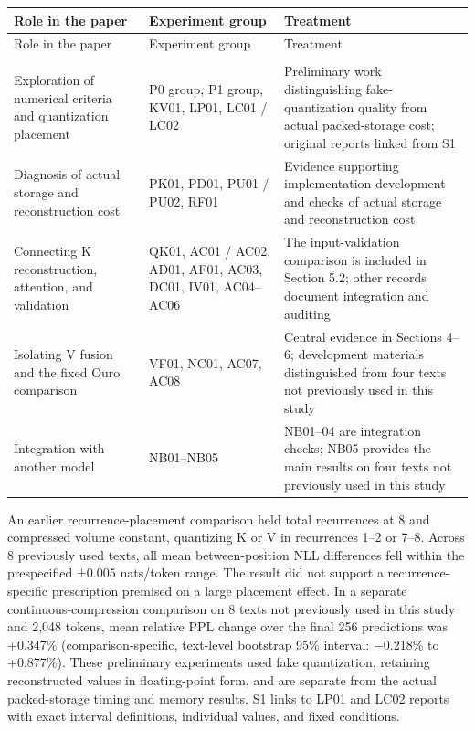 \documentclass[10pt,a4paper]{article}
\newlength{\usable}
\begin{document}
\begingroup\fontsize{9.1}{12}\selectfont\setlength{\parskip}{1pt}
\setlength{\usable}{\dimexpr\linewidth-4\tabcolsep\relax}
\begin{longtable}{@{}>{\raggedright\arraybackslash}p{0.26\usable}>{\raggedright\arraybackslash}p{0.3\usable}>{\raggedright\arraybackslash}p{0.44\usable}@{}}
\toprule
Role in the paper & Experiment group & Treatment \\
\midrule\endfirsthead
\toprule
Role in the paper & Experiment group & Treatment \\
\midrule\endhead
\midrule
\multicolumn{3}{r}{\scriptsize Continued on the next page}\\\endfoot
\bottomrule\endlastfoot
Exploration of numerical criteria and quantization placement & P0 group, P1 group, KV01, LP01, LC01 / LC02 & Preliminary work distinguishing fake-quantization quality from actual packed-storage cost; original reports linked from S1 \\
Diagnosis of actual storage and reconstruction cost & PK01, PD01, PU01 / PU02, RF01 & Evidence supporting implementation development and checks of actual storage and reconstruction cost \\
Connecting K reconstruction, attention, and validation & QK01, AC01 / AC02, AD01, AF01, AC03, DC01, IV01, AC04--AC06 & The input-validation comparison is included in Section 5.2; other records document integration and auditing \\
Isolating V fusion and the fixed Ouro comparison & VF01, NC01, AC07, AC08 & Central evidence in Sections 4--6; development materials distinguished from four texts not previously used in this study \\
Integration with another model & NB01--NB05 & NB01--04 are integration checks; NB05 provides the main results on four texts not previously used in this study \\
\end{longtable}\endgroup

An earlier recurrence-placement comparison held total recurrences at 8 and compressed volume constant, quantizing K or V in recurrences 1--2 or 7--8. Across 8 previously used texts, all mean between-position NLL differences fell within the prespecified ±0.005 nats/token range. The result did not support a recurrence-specific prescription premised on a large placement effect. In a separate continuous-compression comparison on 8 texts not previously used in this study and 2,048 tokens, mean relative PPL change over the final 256 predictions was +0.347\% (comparison-specific, text-level bootstrap 95\% interval: −0.218\% to +0.877\%). These preliminary experiments used fake quantization, retaining reconstructed values in floating-point form, and are separate from the actual packed-storage timing and memory results. S1 links to LP01 and LC02 reports with exact interval definitions, individual values, and fixed conditions.
\end{document}
